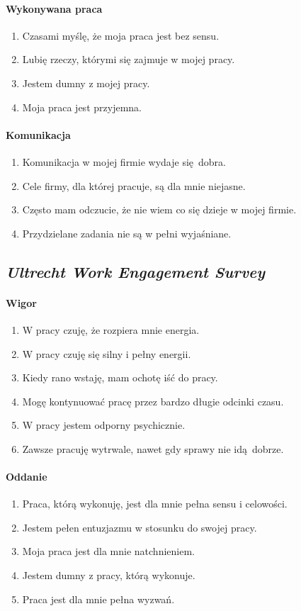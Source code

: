 \paragraph{Wykonywana praca}
\begin{enumerate}
  \item Czasami myślę, że moja praca jest bez sensu.
  \item Lubię rzeczy, którymi się zajmuje w mojej pracy.
  \item Jestem dumny z mojej pracy.
  \item Moja praca jest przyjemna.
\end{enumerate}

\paragraph{Komunikacja}
\begin{enumerate}
  \item Komunikacja w mojej firmie wydaje się dobra.
  \item Cele firmy, dla której pracuje, są dla mnie niejasne.
  \item Często mam odczucie, że nie wiem co się dzieje w mojej firmie.
  \item Przydzielane zadania nie są w pełni wyjaśniane.
\end{enumerate}

\subsection{\emph{Ultrecht Work Engagement Survey}}
\paragraph{Wigor}
\begin{enumerate}
  \item W pracy czuję, że rozpiera mnie energia.
  \item W pracy czuję się silny i pełny energii.
  \item Kiedy rano wstaję, mam ochotę iść do pracy.
  \item Mogę kontynuować pracę przez bardzo długie odcinki czasu.
  \item W pracy jestem odporny psychicznie.
  \item Zawsze pracuję wytrwale, nawet gdy sprawy nie idą dobrze.
\end{enumerate}

\paragraph{Oddanie}
\begin{enumerate}
  \item Praca, którą wykonuję, jest dla mnie pełna sensu i celowości.
  \item Jestem pełen entuzjazmu w stosunku do swojej pracy.
  \item Moja praca jest dla mnie natchnieniem.
  \item Jestem dumny z pracy, którą wykonuje.
  \item Praca jest dla mnie pełna wyzwań.
\end{enumerate}

